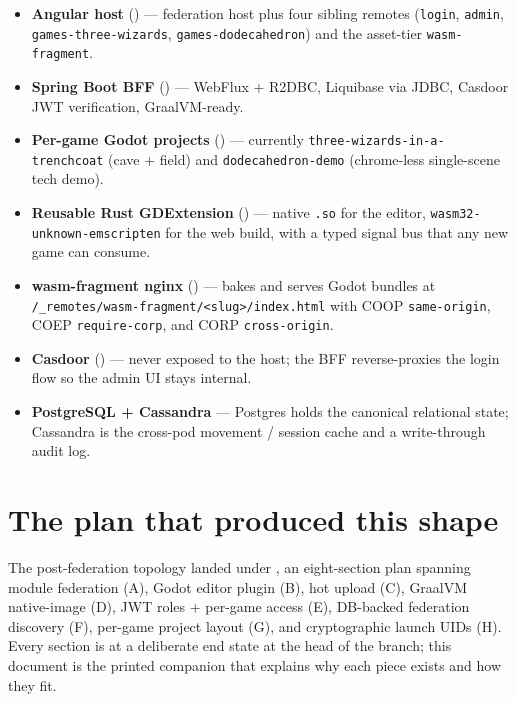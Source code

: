 \begin{itemize}
  \item \textbf{Angular host} () — federation host plus
        four sibling remotes (\texttt{login}, \texttt{admin},
        \texttt{games-three-wizards}, \texttt{games-dodecahedron}) and
        the asset-tier \texttt{wasm-fragment}.
  \item \textbf{Spring Boot BFF} () — WebFlux + R2DBC,
        Liquibase via JDBC, Casdoor JWT verification, GraalVM-ready.
  \item \textbf{Per-game Godot projects} () — currently
        \texttt{three-wizards-in-a-trenchcoat} (cave + field) and
        \texttt{dodecahedron-demo} (chrome-less single-scene tech demo).
  \item \textbf{Reusable Rust GDExtension} ()
        — native \texttt{.so} for the editor, \texttt{wasm32-unknown-emscripten}
        for the web build, with a typed signal bus that any new game can
        consume.
  \item \textbf{wasm-fragment nginx} () — bakes
         and serves
        Godot bundles at \texttt{/\_remotes/wasm-fragment/<slug>/index.html}
        with COOP \texttt{same-origin}, COEP \texttt{require-corp}, and
        CORP \texttt{cross-origin}.
  \item \textbf{Casdoor} () — never exposed to the host;
        the BFF reverse-proxies the login flow so the admin UI stays
        internal.
  \item \textbf{PostgreSQL + Cassandra} — Postgres holds the canonical
        relational state; Cassandra is the cross-pod movement / session
        cache and a write-through audit log.
\end{itemize}

\section{The plan that produced this shape}

The post-federation topology landed under
, an eight-section plan
spanning module federation (A), Godot editor plugin (B), hot upload (C),
GraalVM native-image (D), JWT roles + per-game access (E), DB-backed
federation discovery (F), per-game project layout (G), and cryptographic
launch UIDs (H). Every section is at a deliberate end state at the head
of the  branch; this
document is the printed companion that explains why each piece exists and
how they fit.

